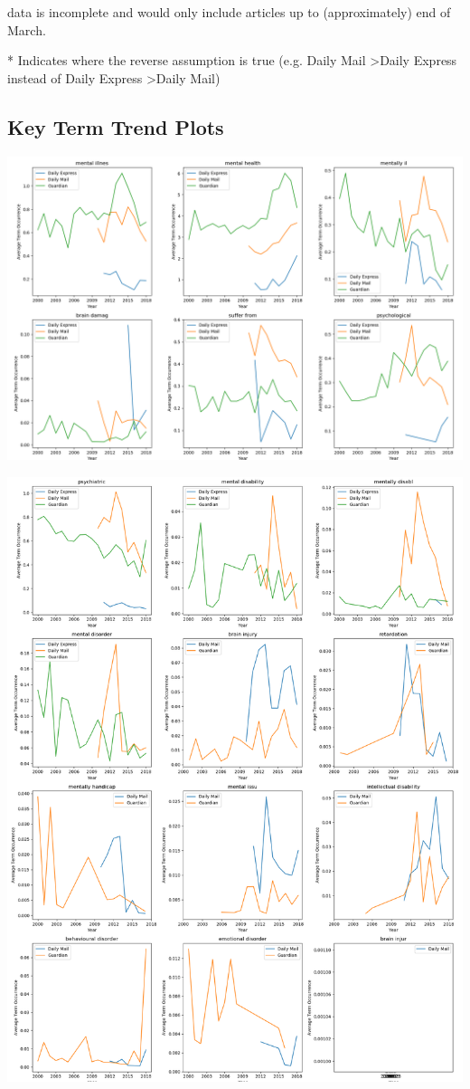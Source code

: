 \documentclass{report}
\begin{document}
 data is incomplete and would only include articles up to (approximately) end of March.

\noindent ** Indicates where the reverse assumption is true (e.g. Daily Mail \textgreater\space Daily Express instead of Daily Express \textgreater\space Daily Mail)

\subsection{Key Term Trend Plots}
\includegraphics[width=\textwidth]{raw/mental-illness-terms.png}

\includegraphics[width=\textwidth]{raw/mental-illness-terms2.png}
\end{document}
